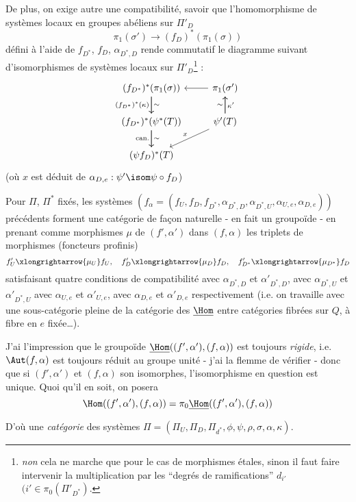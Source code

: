 De plus, on exige autre une compatibilité, savoir que l'homomorphisme de systèmes locaux en groupes abéliens sur $\Pi'_D$
$$
\pi_1(\sigma') \to (f_D)^* (\pi_1(\sigma))
$$
défini à l'aide de $f_{D^*}$, $f_D$, $\alpha_{D^*, D}$ rende commutatif le diagramme suivant d'isomorphismes de systèmes locaux sur $\Pi'_D$\footnote{\emph{non} cela ne marche que pour le cas de morphismes étales, sinon il faut faire intervenir la multiplication par les ``degrés de ramifications'' $d_{i'}$ $(i' \in \pi_0(\Pi'_{D^*})$.} :
\[\begin{tikzcd}
	{(f_{D^*})^*(\pi_1(\sigma))} & {\pi_1(\sigma')} \\
	{(f_{D^*})^*(\psi^* (T))} & {\psi'(T)} \\
	{(\psi f_D)^* (T)}
	\arrow[from=1-2, to=1-1]
	\arrow["\sim", from=2-2, to=1-2]
	\arrow["{\kappa'}"', from=2-2, to=1-2]
	\arrow["x"', from=2-2, to=3-1]
	\arrow["{\text{can.}}"', from=2-1, to=3-1]
	\arrow["\sim", from=2-1, to=3-1]
	\arrow["{(f_{D^*})^*(\kappa)}"', from=1-1, to=2-1]
	\arrow["\sim", from=1-1, to=2-1]
\end{tikzcd}\]
(où $x$ est déduit de $\alpha_ {D, e}: \psi' \isom \psi \circ f_D$)

Pour $\Pi$, $\Pi^*$ fixés, les systèmes $(f_\alpha = (f_U, f_D, f_{D^*}, \alpha_{D^*, D}, \alpha_{D^*, U}, \alpha_{U, e}, \alpha_{D, e}))$ précédents forment une catégorie de fa\c{c}on naturelle - en fait un groupoïde - en prenant comme morphismes $\mu$ de $(f', \alpha')$ dans $(f, \alpha)$ les triplets de morphismes (foncteurs profinis)
$$
f'_U \xlongrightarrow{\mu_U} f_U, \quad f'_D \xlongrightarrow{\mu_D} f_D, \quad f'_{D^*} \xlongrightarrow{\mu_{D^*}} f_D
$$
satisfaisant quatre conditions de compatibilité avec $\alpha_{D^*, D}$ et $\alpha'_{D^*, D}$, avec $\alpha_{D^*, U}$ et $\alpha'_{D^*, U}$ avec $\alpha_{U, e}$ et $\alpha'_{U, e}$, avec $\alpha_{D, e}$ et $\alpha'_{D, e}$ respectivement (i.e. on travaille avec une sous-catégorie pleine de la catégorie des $\underline{\Hom}$ entre catégories fibrées sur $Q$, à fibre en $e$ fixée\dots).

J'ai l'impression que le groupoïde $\underline{\Hom}((f', \alpha'), (f, \alpha))$ est toujours \emph{rigide}, i.e. $\Aut(f, \alpha)$ est toujours réduit au groupe unité - j'ai la flemme de vérifier - donc que si $(f', \alpha')$ et $(f, \alpha)$ son isomorphes, l'isomorphisme en question est unique. Quoi qu'il en soit, on posera
$$
\Hom((f', \alpha'), (f, \alpha)) = \pi_0 \underline{\Hom}((f', \alpha'), (f, \alpha))
$$

D'où une \emph{catégorie} des systèmes $\Pi = (\Pi_U, \Pi_D, \Pi_{d^*}, \phi, \psi, \rho, \sigma, \alpha, \kappa)$.

